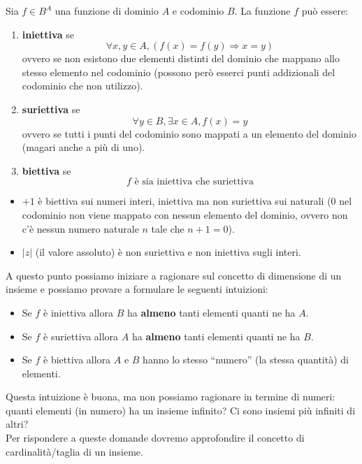 \documentclass[
  a4paper,
]{article}
\providecommand{\tightlist}{%
  \setlength{\itemsep}{0pt}\setlength{\parskip}{0pt}}
\begin{document}
Sia \(f \in B^A\) una funzione di dominio \(A\) e codominio \(B\). La
funzione \(f\) può essere:

\begin{enumerate}
\def\labelenumi{\arabic{enumi}.}
\item
  \textbf{iniettiva} se
  \[\forall x, y \in A, (f(x) = f(y) \Rightarrow x = y)\]ovvero se non
  esistono due elementi distinti del dominio che mappano allo stesso
  elemento nel codominio (possono però esserci punti addizionali del
  codominio che non utilizzo).
\item
  \textbf{suriettiva} se
  \[ \forall y \in B, \exists x \in A, f(x) = y \] ovvero se tutti i
  punti del codominio sono mappati a un elemento del dominio (magari
  anche a più di uno).
\item
  \textbf{biettiva} se \[ f \text{ è sia iniettiva che suriettiva} 
  \]
\end{enumerate}

\begin{examplebox}[Esempi]

\begin{itemize}
\tightlist
\item
  \(+1\) è biettiva sui numeri interi, iniettiva ma non suriettiva sui
  naturali (\(0\) nel codominio non viene mappato con nessun elemento
  del dominio, ovvero non c'è nessun numero naturale \(n\) tale che
  \(n + 1 = 0\)).
\item
  \(\left| z \right|\) (il valore assoluto) è non suriettiva e non
  iniettiva sugli interi.\\
\end{itemize}

\end{examplebox}

A questo punto possiamo iniziare a ragionare sul concetto di dimensione
di un insieme e possiamo provare a formulare le seguenti intuizioni:

\begin{itemize}
\tightlist
\item
  Se \(f\) è iniettiva allora \(B\) ha \textbf{almeno} tanti elementi
  quanti ne ha \(A\).
\item
  Se \(f\) è suriettiva allora \(A\) ha \textbf{almeno} tanti elementi
  quanti ne ha \(B\).
\item
  Se \(f\) è biettiva allora \(A\) e \(B\) hanno lo stesso ``numero''
  (la stessa quantità) di elementi.
\end{itemize}

Questa intuizione è buona, ma non possiamo ragionare in termine di
numeri: quanti elementi (in numero) ha un insieme infinito? Ci sono
insiemi più infiniti di altri?\\
Per rispondere a queste domande dovremo approfondire il concetto di
cardinalità/taglia di un insieme.
\end{document}
